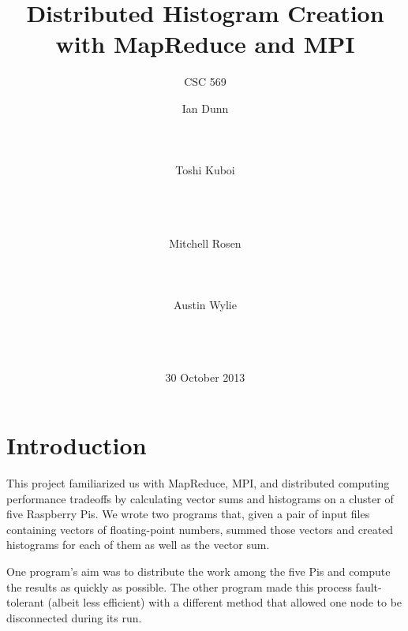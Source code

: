 \documentclass{acm_proc_article-sp}
\begin{document}
\raggedbottom

\title{Distributed Histogram Creation with MapReduce and MPI}
\subtitle{CSC 569}

\author{
\alignauthor
Ian Dunn\\
       \\
       \\
       \\
\alignauthor
Toshi Kuboi\\
       \\
       \\
       \\
       \and %
\alignauthor
Mitchell Rosen\\
       \\
       \\
       \\
\alignauthor
Austin Wylie\\
       \\
       \\
       \\
}

\date{30 October 2013}

\maketitle

\section{Introduction}
This project familiarized us with MapReduce, MPI, and distributed computing performance tradeoffs by calculating vector sums and histograms on a cluster of five Raspberry Pis. We wrote two programs that, given a pair of input files containing vectors of floating-point numbers, summed those vectors and created histograms for each of them as well as the vector sum.

One program's aim was to distribute the work among the five Pis and compute the results as quickly as possible. The other program made this process fault-tolerant (albeit less efficient) with a different method that allowed one node to be disconnected during its run.
\end{document}
